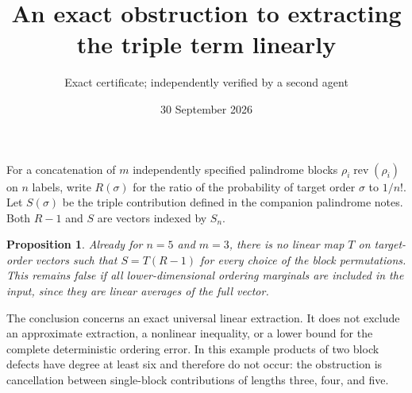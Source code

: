 \documentclass[11pt]{article}
\title{An exact obstruction to extracting the triple term linearly}
\author{Exact certificate; independently verified by a second agent}
\date{30 September 2026}
\newtheorem{proposition}{Proposition}
\begin{document}
\maketitle

For a concatenation of $m$ independently specified palindrome blocks
$\rho_i\operatorname{rev}(\rho_i)$ on $n$ labels, write $R(\sigma)$ for
the ratio of the probability of target order $\sigma$ to $1/n!$.
Let $S(\sigma)$ be the triple contribution defined in the companion
palindrome notes. Both $R-1$ and $S$ are vectors indexed by $S_n$.

\begin{proposition}
Already for $n=5$ and $m=3$, there is no linear map $T$ on target-order
vectors such that $S=T(R-1)$ for every choice of the block permutations.
This remains false if all lower-dimensional ordering marginals are
included in the input, since they are linear averages of the full vector.
\end{proposition}

The conclusion concerns an exact universal linear extraction. It does
not exclude an approximate extraction, a nonlinear inequality, or a
lower bound for the complete deterministic ordering error. In this
example products of two block defects have degree at least six and
therefore do not occur: the obstruction is cancellation between
single-block contributions of lengths three, four, and five.
\end{document}
